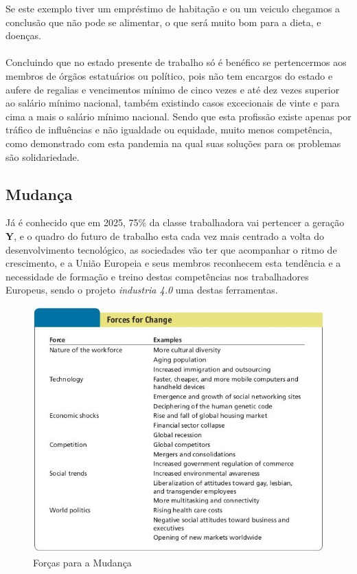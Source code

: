 Se este exemplo tiver um empréstimo de habitação e ou um veiculo chegamos a conclusão que não pode se alimentar, o que será muito bom para a dieta, e doenças.\\
\\
Concluindo que no estado presente de trabalho só é benéfico se pertencermos aos membros de órgãos estatuários ou político, pois não tem encargos do estado e aufere de regalias e vencimentos mínimo de cinco vezes e até dez vezes superior ao salário mínimo nacional, também existindo casos excecionais de vinte e para cima a mais o salário mínimo nacional. Sendo que esta profissão existe apenas por tráfico de influências e não igualdade ou equidade, muito menos competência, como demonstrado com esta pandemia na qual suas soluções para os problemas são solidariedade.
\subsection{Mudança}
\qquad Já é conhecido que em \textsf{2025}, 75\% da classe trabalhadora vai pertencer a geração \textbf{Y}, e o quadro do futuro de trabalho esta cada vez mais centrado a volta do desenvolvimento tecnológico, as sociedades vão ter que acompanhar o ritmo de crescimento, e a União Europeia e seus membros reconhecem esta tendência e a necessidade de formação e treino destas competências nos trabalhadores Europeus, sendo o projeto \textit{industria 4.0} uma destas ferramentas.
\begin{figure}[H]
	\centering
	\includegraphics[scale=0.52]{./image/Change/Forces_for_Change.jpg}
	\caption{Forças para a Mudança \cite{book_7}}
\end{figure}
